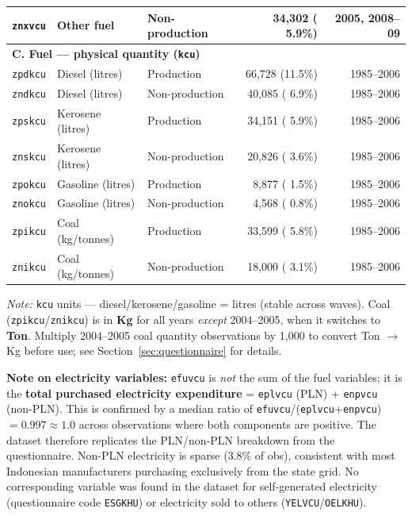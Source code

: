 \documentclass[11pt, a4paper]{article}
\begin{document}
\begin{table}[H]
\begin{tabular}{llp{2.8cm}rr}
\texttt{znxvcu} & Other fuel         & Non-production &  34,302 ( 5.9\%) & 2005, 2008--09 \\
\midrule
\multicolumn{5}{l}{\textbf{C. Fuel --- physical quantity (\texttt{kcu})}} \\
\texttt{zpdkcu} & Diesel (litres)     & Production     &  66,728 (11.5\%) & 1985--2006 \\
\texttt{zndkcu} & Diesel (litres)     & Non-production &  40,085 ( 6.9\%) & 1985--2006 \\
\texttt{zpskcu} & Kerosene (litres)   & Production     &  34,151 ( 5.9\%) & 1985--2006 \\
\texttt{znskcu} & Kerosene (litres)   & Non-production &  20,826 ( 3.6\%) & 1985--2006 \\
\texttt{zpokcu} & Gasoline (litres)   & Production     &   8,877 ( 1.5\%) & 1985--2006 \\
\texttt{znokcu} & Gasoline (litres)   & Non-production &   4,568 ( 0.8\%) & 1985--2006 \\
\texttt{zpikcu} & Coal (kg/tonnes)    & Production     &  33,599 ( 5.8\%) & 1985--2006 \\
\texttt{znikcu} & Coal (kg/tonnes)    & Non-production &  18,000 ( 3.1\%) & 1985--2006 \\
\bottomrule
\end{tabular}
\vspace{0.3em}

\small \textit{Note:} \texttt{kcu} units --- diesel/kerosene/gasoline = litres (stable across waves).
  Coal (\texttt{zpikcu}/\texttt{znikcu}) is in \textbf{Kg} for all years \textit{except} 2004--2005, when it switches to \textbf{Ton}.
  Multiply 2004--2005 coal quantity observations by 1{,}000 to convert Ton $\to$ Kg before use;
  see Section~\ref{sec:questionnaire} for details.
\end{table}

\noindent\textbf{Note on electricity variables:} \texttt{efuvcu} is \textit{not} the sum of the fuel
variables; it is the \textbf{total purchased electricity expenditure} =
\texttt{eplvcu} (PLN) + \texttt{enpvcu} (non-PLN). This is confirmed by a median ratio of
\texttt{efuvcu}/(\texttt{eplvcu}+\texttt{enpvcu}) $= 0.997 \approx 1.0$ across observations
where both components are positive. The dataset therefore replicates the PLN/non-PLN
breakdown from the questionnaire. Non-PLN electricity is sparse (3.8\% of obs),
consistent with most Indonesian manufacturers purchasing exclusively from the state grid.
No corresponding variable was found in the dataset for self-generated electricity
(questionnaire code \texttt{ESGKHU}) or electricity sold to others (\texttt{YELVCU}/\texttt{OELKHU}).
\end{document}
